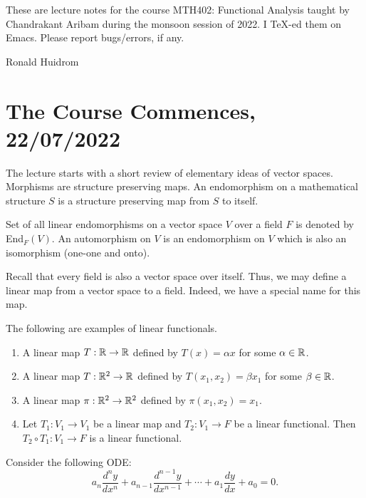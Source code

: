 \documentclass{amsart}
\begin{document}


These are lecture notes for the course MTH402: Functional Analysis taught by Chandrakant Aribam during the monsoon session of 2022. I \TeX{}-ed them on Emacs. Please report bugs/errors, if any.

\hfill Ronald Huidrom

\tableofcontents

\section{The Course Commences, 22/07/2022} 

The lecture starts with a short review of elementary ideas of vector spaces. Morphisms are structure preserving maps. An endomorphism on a mathematical structure $S$ is a structure preserving map from $S$ to itself.


Set of all linear endomorphisms on a vector space $V$ over a field $F$ is denoted by End$_F(V)$. An automorphism on $V$ is an endomorphism on $V$ which is also an isomorphism (one-one and onto).

Recall that every field is also a vector space over itself. Thus, we may define a linear map from a vector space to a field. Indeed, we have a special name for this map.


The following are examples of linear functionals.

\begin{enumerate}
\item A linear map $T: \mathbb{R} \to \mathbb{R} $ defined by $T(x) = \alpha x$ for some $\alpha \in \mathbb{R}$. 
\item A linear map $T: \mathbb{R}^2 \to \mathbb{R}$ defined by $T(x_1, x_2) = \beta x_1$ for some $\beta \in \mathbb{R}$. 
\item A linear map $\pi: \mathbb{R}^2 \to \mathbb{R}^2$ defined by $\pi(x_1, x_2) = x_1$. 
\item Let $T_1:V_1 \to V_1$ be a linear map and $T_2: V_1 \to F$ be a linear functional. Then $T_2\circ T_1: V_1 \to F$ is a linear functional. 
\end{enumerate}

Consider the following ODE: 
\begin{equation}
\label{eq:1}
a_n \frac{d^ny}{dx^n} + a_{n-1} \frac{d^{n-1}y}{dx^{n-1}} + \cdots + a_1 \frac{dy}{dx} + a_0 = 0.
\end{equation}
\end{document}
